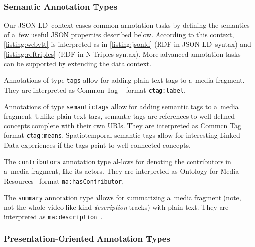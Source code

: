 \documentclass{sig-alternate-ceur}
\def\JSONLD{\mbox{JSON-LD}}
\begin{document}
\subsubsection{Semantic Annotation Types}

Our \JSONLD\ context eases common annotation tasks
by defining the semantics of a~few useful JSON properties described below.
According to this context, \autoref{listing:webvtt} is interpreted as in
\autoref{listing:jsonld} (RDF in \JSONLD\ syntax) and \autoref{listing:rdftriples}
(RDF in N-Triples syntax).
More advanced annotation tasks can be supported by extending the data context.

\begin{description}[leftmargin=*]
  \item[Plain Text Tags] Annotations of type
  \texttt{tags} allow for add\-ing plain text tags
  to a~media fragment.
  They are interpreted as Common Tag%
  ~\cite{commontag2009spec} format \texttt{ctag:label}.

  \item[Semantic Tags] Annotations of type
  \texttt{semanticTags} allow for adding semantic tags
  to a~media fragment.
  Unlike plain text tags, semantic tags are references to
  well-defined concepts complete with their own URIs.
  They are interpreted as Common Tag%
  ~\cite{commontag2009spec} format \texttt{ctag:means}.
  Spatiotemporal semantic tags allow for
  interesting Linked Data experiences
  if the tags point to well-connected concepts.

  \item[Contributors] The \texttt{contributors} annotation type
  al-\linebreak lows for denoting the contributors in a~media fragment, like its actors.
  They are interpreted as
  Ontology for Media Resources~\cite{lee2012mediaontology}
  format \texttt{ma:hasContributor}.

  \item[Summary] The \texttt{summary} annotation type
  allows for summarizing a~media fragment
  (note, not the whole video like kind \emph{description} tracks)
  with plain text.
  They are interpreted as  
  \texttt{ma:description}~\cite{lee2012mediaontology}.
\end{description}

\subsubsection{Presentation-Oriented Annotation Types}
\end{document}
